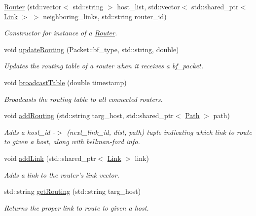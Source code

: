 \begin{DoxyCompactItemize}
\item 
\hyperlink{classRouter_a161477ea1b51f59bcd03da20b5d25243}{\-Router} (std\-::vector$<$ std\-::string $>$ host\-\_\-list, std\-::vector$<$ std\-::shared\-\_\-ptr$<$ \hyperlink{classLink}{\-Link} $>$ $>$ neighboring\-\_\-links, std\-::string router\-\_\-id)
\begin{DoxyCompactList}\small\item\em \-Constructor for instance of a \hyperlink{classRouter}{\-Router}. \end{DoxyCompactList}\item 
void \hyperlink{classRouter_a9517660547398a913aab151a3f058fbf}{update\-Routing} (\-Packet\-::bf\-\_\-type, std\-::string, double)
\begin{DoxyCompactList}\small\item\em \-Updates the routing table of a router when it receives a bf\-\_\-packet. \end{DoxyCompactList}\item 
void \hyperlink{classRouter_a0b106e96412284611079588b65721aa6}{broadcast\-Table} (double timestamp)
\begin{DoxyCompactList}\small\item\em \-Broadcasts the routing table to all connected routers. \end{DoxyCompactList}\item 
void \hyperlink{classRouter_a923848a34881212d310a738032d31610}{add\-Routing} (std\-::string targ\-\_\-host, std\-::shared\-\_\-ptr$<$ \hyperlink{classPath}{\-Path} $>$ path)
\begin{DoxyCompactList}\small\item\em \-Adds a host\-\_\-id -\/$>$ (next\-\_\-link\-\_\-id, dist, path) tuple indicating which link to route to given a host, along with bellman-\/ford info. \end{DoxyCompactList}\item 
void \hyperlink{classRouter_aa28dfae66a6e2587d3c39da83059a866}{add\-Link} (std\-::shared\-\_\-ptr$<$ \hyperlink{classLink}{\-Link} $>$ link)
\begin{DoxyCompactList}\small\item\em \-Adds a link to the router's link vector. \end{DoxyCompactList}\item 
std\-::string \hyperlink{classRouter_a2c333b431ae61349b91277cda82a3f5e}{get\-Routing} (std\-::string targ\-\_\-host)
\begin{DoxyCompactList}\small\item\em \-Returns the proper link to route to given a host. \end{DoxyCompactList}\item 

\end{DoxyCompactItemize}
